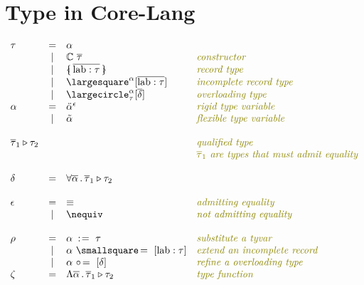 \documentclass[11pt,a4paper]{article}
\newcommand{\nbkey}[1]{\textrm{#1}}
\newcommand{\record}[1]{\{\!\!\shortmid #1 \shortmid\!\!\}}
\newcommand{\overld}[3]{\largecircle^{#1}_{#2}{#3}}
\newcommand{\irecrd}[2]{\largesquare^{#1}{#2}}
\newcommand{\tyvarsubst}[2]{#1\ \hspace{-0.2ex}:\hspace{1pt}=\ #2}
\newcommand{\ovldrefine}[2]{#1\ \circ\hspace{-0.3ex}=\ #2}
\newcommand{\irecextend}[2]{#1\ \smallsquare\hspace{-0.3ex}=\ #2}
\newcommand{\lab}{\nbkey{lab}}
\newcommand{\rigdvar}[1]{\ddot{#1}}
\newcommand{\flexvar}[1]{\tilde#1}
\newcommand{\comment}[1]{\textit{\color{olive}#1}}
\newcommand{\tycon}{\mathbb{C}}
\newcommand{\tyfun}{\zeta}
\newcommand{\type}{\tau}
\newcommand{\qualtype}[2]{#1 \triangleright #2}
\newcommand{\scheme}{\delta}
\newcommand{\substitute}{\rho}
\newcommand{\equality}{\epsilon}
\newcommand{\eqyes}{\equiv}
\newcommand{\eqnot}{\nequiv}
\newcommand{\vect}[1]{\overline{#1}}
\begin{document}
\section{Type in Core-Lang}
{\renewcommand{\arraystretch}{1.2}\[
\begin{array}{lcll}
\type
     & = & \alpha                                           & \\
     & | & \tycon\ \vect\type              	            	&\comment{constructor}\\
     & | & \record{\vect{\lab:\type}}       		    		&\comment{record type}\\
     & | & \irecrd{\alpha}{[\vect{\lab:\type}]}         		&\comment{incomplete record type}\\
     & | & \overld{\alpha}{\type}{[\vect\scheme]}     		&\comment{overloading type}\\
\alpha 
     & = & \rigdvar{\alpha}^{\equality}                     &\comment{rigid type variable}\\
     & | & \flexvar{\alpha}                                 &\comment{flexible type variable}\\     
\\
\qualtype{\vect\type_1}{\type_2} & &                        &\comment{qualified type} \\
                            & &                             &\comment{$\vect\type_1$ are types that must admit equality} \\
\\     
\scheme 
     & = & \forall \vect{\alpha}\,.\,\qualtype{\vect\type_1}{\type_2}
                                                            &\\
\\
\equality
	& = & \eqyes	& \comment{admitting equality}     \\
	& | & \eqnot	& \comment{not admitting equality} \\
\\
\substitute
     & = & \tyvarsubst{\alpha}{\type}                   	&\comment{substitute a tyvar}\\
     & | & \irecextend{\alpha}{[\lab:\type]}	     	    &\comment{extend an incomplete record}\\
     & | & \ovldrefine{\alpha}{[\scheme]}               	&\comment{refine a overloading type}\\

\tyfun
     & = & \Lambda{\vect{\alpha}}\,.\,{\qualtype{\vect\type_1}{\type_2}} 
                                                            &\comment{type function}\\
\end{array}
\]}
\end{document}
